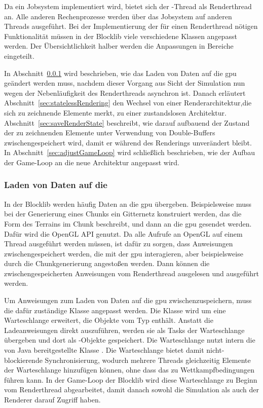 Da ein Jobsystem implementiert wird, bietet sich der -Thread als Renderthread an. Alle anderen Rechenprozesse werden über das Jobsystem auf anderen Threads ausgeführt. Bei der Implementierung der für einen Renderthread nötigen Funktionalität müssen in der Blocklib viele verschiedene Klassen angepasst werden. Der Übersichtlichkeit halber werden die Anpassungen in Bereiche eingeteilt. 

In Abschnitt~\ref{sec:loader} wird beschrieben, wie das Laden von Daten auf die \ac{gpu} geändert werden muss, nachdem dieser Vorgang aus Sicht der Simulation nun wegen der Nebenläufigkeit des Renderthreads asynchron ist. Danach erläutert Abschnitt~\ref{sec:statelessRendering} den Wechsel von einer Renderarchitektur,die sich zu zeichnende Elemente merkt, zu einer zustandslosen Architektur. Abschnitt~\ref{sec:saveRenderState} beschreibt, wie darauf aufbauend der Zustand der zu zeichnenden Elemente unter Verwendung von Double-Buffers zwischengespeichert wird, damit er während des Renderings unverändert bleibt. In Abschnitt~\ref{sec:adjustGameLoop} wird schließlich beschrieben, wie der Aufbau der Game-Loop an die neue Architektur angepasst wird.

\subsubsection{Laden von Daten auf die }\label{sec:loader}
In der Blocklib werden häufig Daten an die \ac{gpu} übergeben. Beispielsweise muss bei der Generierung eines Chunks ein Gitternetz konstruiert werden, das die Form des Terrains im Chunk beschreibt, und dann an die \ac{gpu} gesendet werden. Dafür wird die OpenGL API genutzt. Da alle Aufrufe an OpenGL auf einem Thread ausgeführt werden müssen, ist dafür zu sorgen, dass Anweisungen zwischengespeichert werden, die mit der \ac{gpu} interagieren, aber beispielsweise durch die Chunkgenerierung angestoßen werden. Dann können die zwischengespeicherten Anweisungen vom Renderthread ausgelesen und ausgeführt werden. 

Um Anweisungen zum Laden von Daten auf die \ac{gpu} zwischenzuspeichern, muss die dafür zuständige Klasse  angepasst werden. Die Klasse wird um eine Warteschlange erweitert, die Objekte vom Typ  enthält. Anstatt die Ladeanweisungen direkt auszuführen, werden sie als Tasks der Warteschlange übergeben und dort als -Objekte gespeichert. Die Warteschlange nutzt intern die von Java bereitgestellte Klasse . Die Warteschlange bietet damit nicht-blockierende Synchronisierung, wodurch mehrere Threads gleichzeitig Elemente der Warteschlange hinzufügen können, ohne dass das zu Wettkampfbedingungen führen kann. In der Game-Loop der Blocklib wird diese Warteschlange zu Beginn vom Renderthread abgearbeitet, damit danach sowohl die Simulation als auch der Renderer darauf Zugriff haben. 


